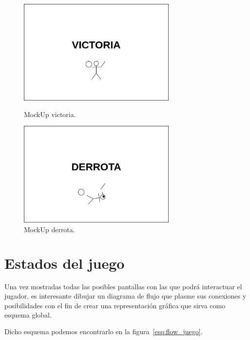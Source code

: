 \begin{figure}[ht]
\centering
\begin{minipage}[c]{0.45\linewidth}
	\hspace{9mm}
	\includegraphics[width=0.7\textwidth]{imagenes/gdd/pantallas/Pantalla_victoria.png}
	\caption{MockUp victoria.}
	\label{mockup_victoria}
\end{minipage}
\begin{minipage}[c]{0.45\linewidth}
	\hspace{9mm}
	\includegraphics[width=0.7\textwidth]{imagenes/gdd/pantallas/Pantalla_derrota.png}
	\caption{MockUp derrota.}
	\label{mockup_derrota}
\end{minipage}	
\end{figure}

\section{Estados del juego}
Una vez mostradas todas las posibles pantallas con las que podrá interactuar el jugador,
es interesante dibujar un diagrama de flujo que plasme sus conexiones y posibilidades
con el fin de crear una representación gráfica que sirva como esquema global.

Dicho esquema podemos encontrarlo en la figura~\ref{esq:flow_juego}.


